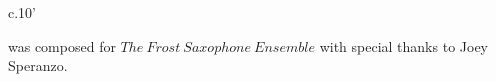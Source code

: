 \documentclass[10pt]{article}
\begin{document}
\vspace*{3\baselineskip}

\begin{center}
c.10'
\end{center}

\vspace*{1\baselineskip}

\begin{center}
 was composed for $The \ Frost \ Saxophone \ Ensemble$ with special thanks to Joey Speranzo.
\end{center}
\end{document}
